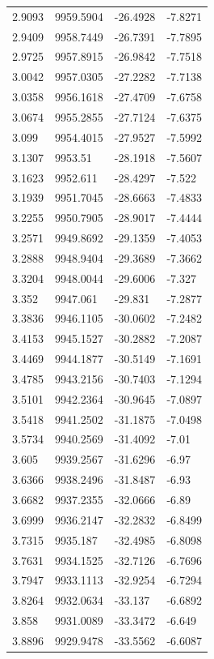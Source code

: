 \begin{table}[H]
\begin{tabular}{llll}
2.9093 & 9959.5904 & -26.4928 & -7.8271 \\
2.9409 & 9958.7449 & -26.7391 & -7.7895 \\
2.9725 & 9957.8915 & -26.9842 & -7.7518 \\
3.0042 & 9957.0305 & -27.2282 & -7.7138 \\
3.0358 & 9956.1618 & -27.4709 & -7.6758 \\
3.0674 & 9955.2855 & -27.7124 & -7.6375 \\
3.099 & 9954.4015 & -27.9527 & -7.5992 \\
3.1307 & 9953.51 & -28.1918 & -7.5607 \\
3.1623 & 9952.611 & -28.4297 & -7.522 \\
3.1939 & 9951.7045 & -28.6663 & -7.4833 \\
3.2255 & 9950.7905 & -28.9017 & -7.4444 \\
3.2571 & 9949.8692 & -29.1359 & -7.4053 \\
3.2888 & 9948.9404 & -29.3689 & -7.3662 \\
3.3204 & 9948.0044 & -29.6006 & -7.327 \\
3.352 & 9947.061 & -29.831 & -7.2877 \\
3.3836 & 9946.1105 & -30.0602 & -7.2482 \\
3.4153 & 9945.1527 & -30.2882 & -7.2087 \\
3.4469 & 9944.1877 & -30.5149 & -7.1691 \\
3.4785 & 9943.2156 & -30.7403 & -7.1294 \\
3.5101 & 9942.2364 & -30.9645 & -7.0897 \\
3.5418 & 9941.2502 & -31.1875 & -7.0498 \\
3.5734 & 9940.2569 & -31.4092 & -7.01 \\
3.605 & 9939.2567 & -31.6296 & -6.97 \\
3.6366 & 9938.2496 & -31.8487 & -6.93 \\
3.6682 & 9937.2355 & -32.0666 & -6.89 \\
3.6999 & 9936.2147 & -32.2832 & -6.8499 \\
3.7315 & 9935.187 & -32.4985 & -6.8098 \\
3.7631 & 9934.1525 & -32.7126 & -6.7696 \\
3.7947 & 9933.1113 & -32.9254 & -6.7294 \\
3.8264 & 9932.0634 & -33.137 & -6.6892 \\
3.858 & 9931.0089 & -33.3472 & -6.649 \\
3.8896 & 9929.9478 & -33.5562 & -6.6087 \\

\end{tabular}
\end{table}
